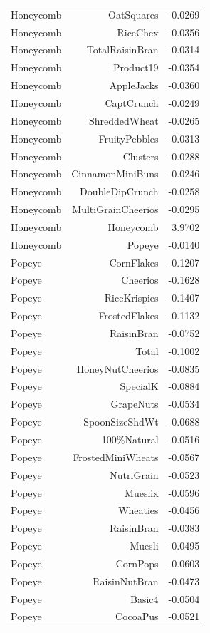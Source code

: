 \begin{longtable}{@{}lrr@{}}
Honeycomb & OatSquares & -0.0269 \\
Honeycomb & RiceChex & -0.0356 \\
Honeycomb & TotalRaisinBran & -0.0314 \\
Honeycomb & Product19 & -0.0354 \\
Honeycomb & AppleJacks & -0.0360 \\
Honeycomb & CaptCrunch & -0.0249 \\
Honeycomb & ShreddedWheat & -0.0265 \\
Honeycomb & FruityPebbles & -0.0313 \\
Honeycomb & Clusters & -0.0288 \\
Honeycomb & CinnamonMiniBuns & -0.0246 \\
Honeycomb & DoubleDipCrunch & -0.0258 \\
Honeycomb & MultiGrainCheerios & -0.0295 \\
Honeycomb & Honeycomb & 3.9702 \\
Honeycomb & Popeye & -0.0140 \\
Popeye & CornFlakes & -0.1207 \\
Popeye & Cheerios & -0.1628 \\
Popeye & RiceKrispies & -0.1407 \\
Popeye & FrostedFlakes & -0.1132 \\
Popeye & RaisinBran & -0.0752 \\
Popeye & Total & -0.1002 \\
Popeye & HoneyNutCheerios & -0.0835 \\
Popeye & SpecialK & -0.0884 \\
Popeye & GrapeNuts & -0.0534 \\
Popeye & SpoonSizeShdWt & -0.0688 \\
Popeye & 100\%Natural & -0.0516 \\
Popeye & FrostedMiniWheats & -0.0567 \\
Popeye & NutriGrain & -0.0523 \\
Popeye & Mueslix & -0.0596 \\
Popeye & Wheaties & -0.0456 \\
Popeye & RaisinBran & -0.0383 \\
Popeye & Muesli & -0.0495 \\
Popeye & CornPops & -0.0603 \\
Popeye & RaisinNutBran & -0.0473 \\
Popeye & Basic4 & -0.0504 \\
Popeye & CocoaPus & -0.0521 \\

\end{longtable}
